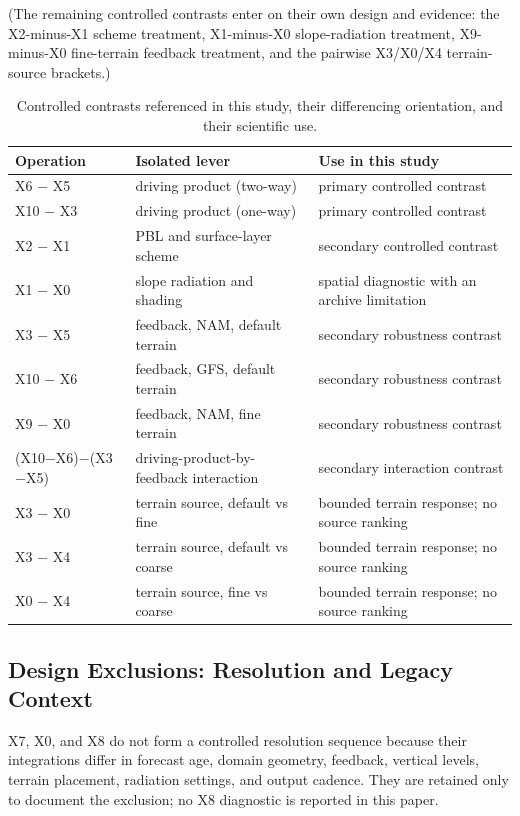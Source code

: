 \documentclass[air,article,submit,moreauthors]{Definitions/mdpi}
\begin{document}
(The remaining controlled contrasts enter on their own design and evidence: the X2-minus-X1 scheme treatment, X1-minus-X0 slope-radiation treatment, X9-minus-X0 fine-terrain feedback treatment, and the pairwise X3/X0/X4 terrain-source brackets.)

\begin{table}[H]
\caption{Controlled contrasts referenced in this study, their differencing orientation, and their scientific use.}
\label{tab:v3-comparisons}
\centering
\small
\begin{tabularx}{\textwidth}{lLL}
\toprule
Operation & Isolated lever & Use in this study \\
\midrule
X6 $-$ X5 & driving product (two-way) & primary controlled contrast \\
X10 $-$ X3 & driving product (one-way) & primary controlled contrast \\
X2 $-$ X1 & PBL and surface-layer scheme & secondary controlled contrast \\
X1 $-$ X0 & slope radiation and shading & spatial diagnostic with an archive limitation \\
X3 $-$ X5 & feedback, NAM, default terrain & secondary robustness contrast \\
X10 $-$ X6 & feedback, GFS, default terrain & secondary robustness contrast \\
X9 $-$ X0 & feedback, NAM, fine terrain & secondary robustness contrast \\
(X10$-$X6)$-$(X3$-$X5) & driving-product-by-feedback interaction & secondary interaction contrast \\
X3 $-$ X0 & terrain source, default vs fine & bounded terrain response; no source ranking \\
X3 $-$ X4 & terrain source, default vs coarse & bounded terrain response; no source ranking \\
X0 $-$ X4 & terrain source, fine vs coarse & bounded terrain response; no source ranking \\
\bottomrule
\end{tabularx}
\end{table}

\subsection{Design Exclusions: Resolution and Legacy Context}
\label{sec:v3-resolution}

X7, X0, and X8 do not form a controlled resolution sequence because their integrations differ in forecast age, domain geometry, feedback, vertical levels, terrain placement, radiation settings, and output cadence.
They are retained only to document the exclusion; no X8 diagnostic is reported in this paper.
\end{document}
